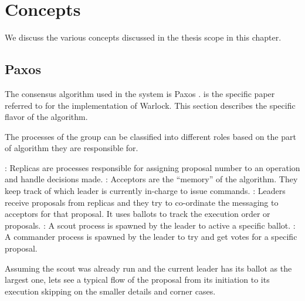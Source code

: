 \chapter{Concepts}
\label{chapter:concepts}

We discuss the various concepts discussed in the thesis scope in this chapter.

\section{Paxos}
\label{section:concepts.paxos}

The consensus algorithm used in the system is Paxos .
\citet{Robbert2011} is the specific paper referred to for the implementation of
Warlock. This section describes the specific flavor of the algorithm.

The processes of the group can be classified into different roles based on the
part of algorithm they are responsible for.

\begin{itemize}
    : Replicas are processes responsible for assigning proposal
    number to an operation and handle decisions made.
    : Acceptors are the ``memory'' of the algorithm. They keep
    track of which leader is currently in-charge to issue commands.
    : Leaders receive proposals from replicas and they try to
    co-ordinate the messaging to acceptors for that proposal. It uses ballots%
    to track the execution order or proposals.
    : A scout process is spawned by the leader to active a specific
    ballot.
    : A commander process is spawned by the leader to try
    and get votes for a specific proposal.
\end{itemize}

Assuming the scout was already run and the current leader has its ballot as the
largest one, lets see a typical flow of the proposal from its initiation to its
execution skipping on the smaller details and corner cases.

